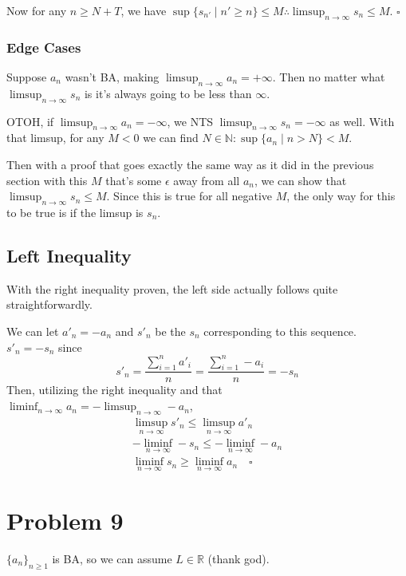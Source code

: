 \documentclass[12pt]{article}
\newcommand{\N}{\mathbb{N}}
\newcommand{\R}{\mathbb{R}}
\begin{document}
Now for any $n \ge N+T$, we have
$\sup \{s_{n'} \mid n' \ge n\} \le M \therefore \limsup_{n \to \infty} s_n \le M$. $\square$

\subsubsection{Edge Cases}

Suppose $a_n$ wasn't BA, making $\limsup_{n \to \infty} a_n = +\infty$.
Then no matter what $\limsup_{n \to \infty} s_n$ is it's always going to be less than $\infty$.

OTOH, if $\limsup_{n \to \infty} a_n = -\infty$, we NTS $\limsup_{n \to \infty} s_n = -\infty$ as well.
With that limsup, for any $M < 0$ we can find $N \in \N: \sup \{a_n \mid n > N\} < M$.

Then with a proof that goes exactly the same way as it did in the previous section
with this $M$ that's some $\epsilon$ away from all $a_n$,
we can show that $\limsup_{n \to \infty} s_n \le M$.
Since this is true for all negative $M$, the only way for this to be true is if the limsup is $s_n$.

\subsection{Left Inequality}

With the right inequality proven, the left side actually follows quite straightforwardly.

We can let $a'_n = -a_n$ and $s'_n$ be the $s_n$ corresponding to this sequence.
$s'_n=-s_n$ since
\[s'_n=\frac{\sum_{i=1}^{n} a'_i}{n}=\frac{\sum_{i=1}^{n} -a_i}{n} = -s_n\]
Then, utilizing the right inequality and that $\liminf_{n \to \infty} a_n = -\limsup_{n \to \infty} -a_n$,
\begin{gather*}
  \limsup_{n \to \infty} s'_n \le \limsup_{n \to \infty} a'_n \\
  -\liminf_{n \to \infty} -s_n \le -\liminf_{n \to \infty} -a_n \\
  \liminf_{n \to \infty} s_n \ge \liminf_{n \to \infty} a_n\quad\square
\end{gather*}

\pagebreak

\section{Problem 9}

$\{a_n\}_{n \ge 1}$ is BA, so we can assume $L \in \R$ (thank god).
\end{document}
